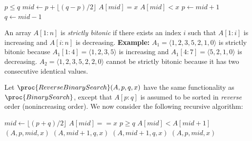 \begin{codebox}
\li \While $p \le q$
\li \Do $mid \gets p + \lfloor (q-p)/2 \rfloor$
\li \If $A[mid] = x$
\li \Then \Return {}
\li \Else \If $A[mid] < x$
\li \Then $p \gets mid + 1$
\li \Else $q \gets mid - 1$\End\End\End
\li \Return {}
\end{codebox}

An array $A[1\!:\!n]$ is \emph{strictly bitonic} if there exists an index $i$ such that $A[1\!:\!i]$ is increasing and $A[i:n]$ is decreasing.
%
{\bf Example:} $A_1 = \langle 1, 2, 3, 5, 2, 1, 0\rangle$ is strictly bitonic because $A_1[1\!:\!4] = \langle 1, 2, 3, 5\rangle$ is increasing and $A_1[4:7] = \langle 5, 2, 1, 0\rangle$ is decreasing. $A_2 = \langle 1, 2, 3, 5, 2, 2, 0\rangle$ cannot be strictly bitonic because it has two consecutive identical values.



Let $\proc{ReverseBinarySearch}(A, p, q, x)$ have the same functionality as $\proc{BinarySearch}$, except that $A[p\!:\!q]$ is assumed to be sorted in \emph{reverse} order (nonincreasing order). We now consider the following recursive algorithm:
%
\begin{codebox}
\li $mid \gets \lfloor (p+q)/2 \rfloor$
\li \If $A[mid]==x$
\li \Then \Return {}
\End
\li \If $p \ge q$
\li \Then \Return {}
\End
\li \If $A[mid] < A[mid+1]$
\Then
\li     \If {}$(A,p,mid,x)$
\li     \Then \Return {}
    \End
\li     \If {}$(A,mid+1,q,x)$
\li     \Then \Return {}
    \End
\li \Else
\li     \If {}$(A,mid+1,q,x)$
\li     \Then \Return {}
    \End
\li     \If {}$(A,p,mid,x)$
\li     \Then \Return {}
    \End
\End
\li \Return {}
\end{codebox}

